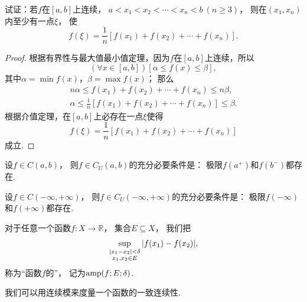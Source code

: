 \begin{example}
试证：若\(f\)在\([a,b]\)上连续，
\(a < x_1 < x_2 < \dotsb < x_n < b \ (n \geq 3)\)，
则在\((x_1,x_n)\)内至少有一点\(\xi\)，
使\begin{equation*}
	f(\xi) = \frac{1}{n} \left[
		f(x_1) + f(x_2) + \dotsb + f(x_n)
	\right].
\end{equation*}
\begin{proof}
根据有界性与最大值最小值定理，因为\(f\)在\([a,b]\)上连续，所以\begin{equation*}
	(\forall x \in [a,b])
	[\alpha \leq f(x) \leq \beta],
\end{equation*}
其中\(\alpha = \min f(x)\)，\(\beta = \max f(x)\)；
那么\begin{gather*}
	n \alpha \leq f(x_1) + f(x_2) + \dotsb + f(x_n) \leq n \beta, \\
	\alpha \leq \frac{1}{n} \left[f(x_1) + f(x_2) + \dotsb + f(x_n)\right] \leq \beta.
\end{gather*}
根据介值定理，在\([a,b]\)上必存在一点\(\xi\)使得\begin{equation*}
	f(\xi) = \frac{1}{n} \left[ f(x_1) + f(x_2) + \dotsb + f(x_n) \right]
\end{equation*}
成立.
\end{proof}
\end{example}

\begin{theorem}\label{theorem:极限.闭区间上连续函数的性质.开区间上的连续函数一致连续的充分必要条件1}
设\(f \in C(a,b)\)，
则\(f \in C_U(a,b)\)的充分必要条件是：
极限\(f(a^+)\)和\(f(b^-)\)都存在.
\end{theorem}

\begin{theorem}\label{theorem:极限.闭区间上连续函数的性质.开区间上的连续函数一致连续的充分必要条件2}
设\(f \in C(-\infty,+\infty)\)，
则\(f \in C_U(-\infty,+\infty)\)的充分必要条件是：
极限\(f(-\infty)\)和\(f(+\infty)\)都存在.
\end{theorem}

\begin{definition}
对于任意一个函数\(f\colon X\to\mathbb{R}\)，
集合\(E \subseteq X\)，
我们把\begin{equation*}
	\sup_{\substack{
		\abs{x_1-x_2}<\delta \\
		x_1,x_2 \in E
	}}\abs{f(x_1)-f(x_2)},
\end{equation*}
称为“函数\(f\)的”，
记为\(\operatorname{amp}(f;E;\delta)\).
\end{definition}

我们可以用连续模来度量一个函数的一致连续性.
